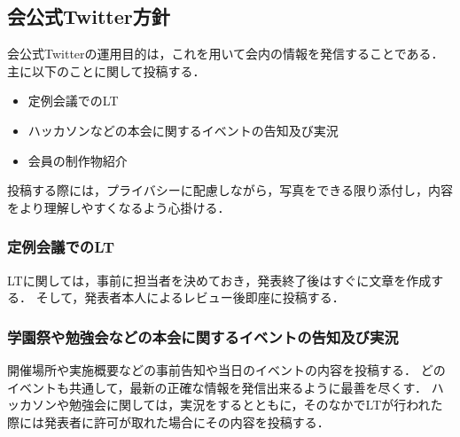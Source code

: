 \subsection*{会公式Twitter方針}



会公式Twitterの運用目的は，これを用いて会内の情報を発信することである．主に以下のことに関して投稿する．
\begin{itemize}
\item 定例会議でのLT
\item ハッカソンなどの本会に関するイベントの告知及び実況
\item 会員の制作物紹介
\end{itemize}

投稿する際には，プライバシーに配慮しながら，写真をできる限り添付し，内容をより理解しやすくなるよう心掛ける．

\subsubsection*{定例会議でのLT}
LTに関しては，事前に担当者を決めておき，発表終了後はすぐに文章を作成する．
そして，発表者本人によるレビュー後即座に投稿する．

\subsubsection*{学園祭や勉強会などの本会に関するイベントの告知及び実況}
開催場所や実施概要などの事前告知や当日のイベントの内容を投稿する．
どのイベントも共通して，最新の正確な情報を発信出来るように最善を尽くす．
ハッカソンや勉強会に関しては，実況をするとともに，そのなかでLTが行われた際には発表者に許可が取れた場合にその内容を投稿する．
